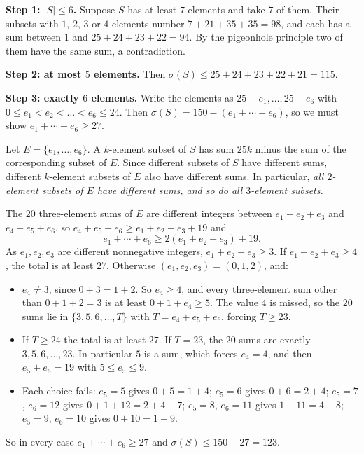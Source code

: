 \textbf{Step 1: $|S|\le6$.} Suppose $S$ has at least $7$ elements and take $7$ of them. Their subsets with $1$, $2$, $3$ or $4$ elements number $7+21+35+35=98$, and each has a sum between $1$ and $25+24+23+22=94$. By the pigeonhole principle two of them have the same sum, a contradiction.

\textbf{Step 2: at most $5$ elements.} Then $\sigma(S)\le25+24+23+22+21=115$.

\textbf{Step 3: exactly $6$ elements.} Write the elements as $25-e_1,\dots,25-e_6$ with $0\le e_1<e_2<\dots<e_6\le24$. Then $\sigma(S)=150-(e_1+\cdots+e_6)$, so we must show $e_1+\cdots+e_6\ge27$.

Let $E=\{e_1,\dots,e_6\}$. A $k$-element subset of $S$ has sum $25k$ minus the sum of the corresponding subset of $E$. Since different subsets of $S$ have different sums, different $k$-element subsets of $E$ also have different sums. In particular, \emph{all $2$-element subsets of $E$ have different sums, and so do all $3$-element subsets.}

The $20$ three-element sums of $E$ are different integers between $e_1+e_2+e_3$ and $e_4+e_5+e_6$, so $e_4+e_5+e_6\ge e_1+e_2+e_3+19$ and
\[e_1+\cdots+e_6\ge2(e_1+e_2+e_3)+19.\]
As $e_1,e_2,e_3$ are different nonnegative integers, $e_1+e_2+e_3\ge3$. If $e_1+e_2+e_3\ge4$, the total is at least $27$. Otherwise $(e_1,e_2,e_3)=(0,1,2)$, and:
\begin{itemize}
\item $e_4\ne3$, since $0+3=1+2$. So $e_4\ge4$, and every three-element sum other than $0+1+2=3$ is at least $0+1+e_4\ge5$. The value $4$ is missed, so the $20$ sums lie in $\{3,5,6,\dots,T\}$ with $T=e_4+e_5+e_6$, forcing $T\ge23$.
\item If $T\ge24$ the total is at least $27$. If $T=23$, the $20$ sums are exactly $3,5,6,\dots,23$. In particular $5$ is a sum, which forces $e_4=4$, and then $e_5+e_6=19$ with $5\le e_5\le9$.
\item Each choice fails: $e_5=5$ gives $0+5=1+4$; $e_5=6$ gives $0+6=2+4$; $e_5=7$, $e_6=12$ gives $0+1+12=2+4+7$; $e_5=8$, $e_6=11$ gives $1+11=4+8$; $e_5=9$, $e_6=10$ gives $0+10=1+9$.
\end{itemize}
So in every case $e_1+\cdots+e_6\ge27$ and $\sigma(S)\le150-27=123$.

